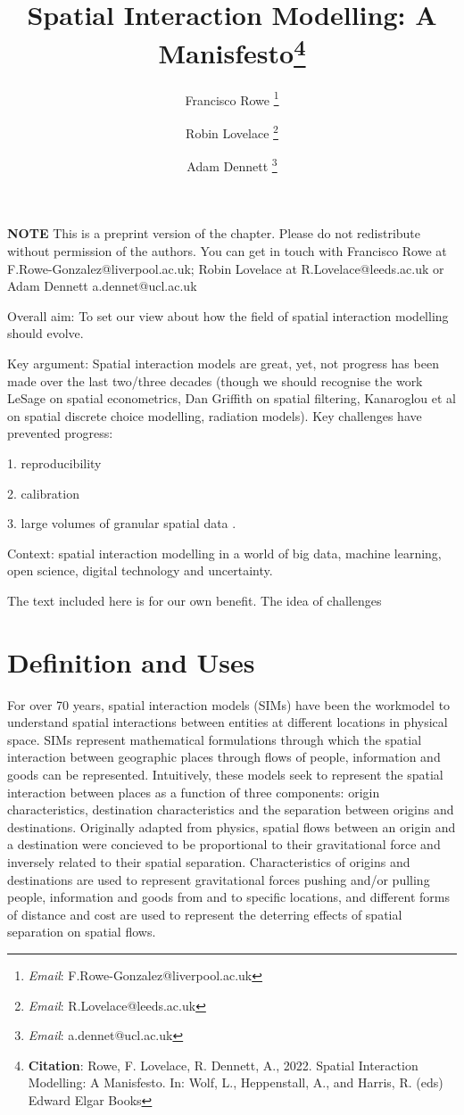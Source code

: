 \documentclass[11pt,letterpaper]{article}
\title{Spatial Interaction Modelling: A Manisfesto\footnote{\textbf{Citation}: Rowe, F. Lovelace, R. Dennett, A., 2022. Spatial Interaction Modelling: A Manisfesto. In: Wolf, L., Heppenstall, A., and Harris, R. (eds) Edward Elgar Books}}
\author[1]{Francisco Rowe \thanks{\textit{Email}: F.Rowe-Gonzalez@liverpool.ac.uk}}
\affil[1]{Geographic Data Science Lab, Department of Geography and Planning, University of Liverpool, Liverpool, United Kingdom}
\author[2]{Robin Lovelace \thanks{\textit{Email}: R.Lovelace@leeds.ac.uk}}
\affil[2]{Institute for Transport Studies, University of Leeds, Leeds, United Kingdom}
\author[3]{Adam Dennett \thanks{\textit{Email}: a.dennet@ucl.ac.uk}}
\affil[3]{The Bartlett Centre for Advanced Spatial Analytics, University College London, London, United Kingdom}
\date{}
\begin{document}
\maketitle


\textbf{NOTE} This is a preprint version of the chapter. Please do not redistribute without
permission of the authors. You can get in touch with Francisco Rowe at
F.Rowe-Gonzalez@liverpool.ac.uk; Robin Lovelace at R.Lovelace@leeds.ac.uk or Adam Dennett a.dennet@ucl.ac.uk

\begin{abstract}


\end{abstract}



\pagebreak

Overall aim: To set our view about how the field of spatial interaction modelling should evolve.

Key argument: Spatial interaction models are great, yet, not progress has been made over the last two/three decades (though we should recognise the work LeSage on spatial econometrics, Dan Griffith on spatial filtering, Kanaroglou et al on spatial discrete choice modelling, radiation models).
Key challenges have prevented progress:

1.
reproducibility

2.
calibration

3.
large volumes of granular spatial data .

Context: spatial interaction modelling in a world of big data, machine learning, open science, digital technology and uncertainty.

The text included here is for our own benefit.
The idea of challenges

\hypertarget{definition-and-uses}{%
\section{Definition and Uses}\label{definition-and-uses}}

For over 70 years, spatial interaction models (SIMs) have been the workmodel to understand spatial interactions between entities at different locations in physical space.
SIMs represent mathematical formulations through which the spatial interaction between geographic places through flows of people, information and goods can be represented.
Intuitively, these models seek to represent the spatial interaction between places as a function of three components: origin characteristics, destination characteristics and the separation between origins and destinations.
Originally adapted from physics, spatial flows between an origin and a destination were concieved to be proportional to their gravitational force and inversely related to their spatial separation.
Characteristics of origins and destinations are used to represent gravitational forces pushing and/or pulling people, information and goods from and to specific locations, and different forms of distance and cost are used to represent the deterring effects of spatial separation on spatial flows.
\end{document}
